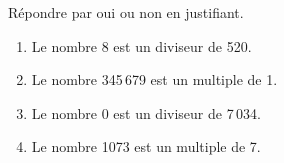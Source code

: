 \documentclass[exercice]{thedocument}%
\begin{document}
%
Répondre par oui ou non en justifiant.
\begin{enumerate}
    \item Le nombre 8 est un diviseur de 520.
    \item Le nombre 345\,679 est un multiple de 1.
    \item Le nombre 0 est un diviseur de 7\,034.
    \item Le nombre 1073 est un multiple de 7.
\end{enumerate}
\end{document}
